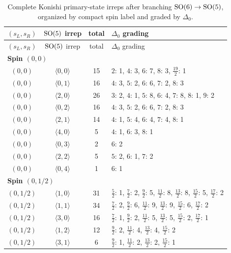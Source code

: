 \begin{longtable}{c c c p{8.8cm}}
\caption{Complete Konishi primary-state irreps after branching $\mathrm{SO}(6)\to \mathrm{SO}(5)$, organized by compact spin label and graded by $\Delta_0$.}\label{tab:konishi-full}\\
\toprule
$(s_L,s_R)$ & $\mathrm{SO}(5)$ irrep & total & $\Delta_0$ grading \\
\midrule
\endfirsthead
\toprule
$(s_L,s_R)$ & $\mathrm{SO}(5)$ irrep & total & $\Delta_0$ grading \\
\midrule
\endhead
\multicolumn{4}{l}{\textbf{Spin $(0,0)$}}\\
$(0,0)$ & $\langle 0,0\rangle$ & 15 & $2$: 1, $4$: 3, $6$: 7, $8$: 3, $\frac{19}{2}$: 1 \\
$(0,0)$ & $\langle 0,1\rangle$ & 16 & $4$: 3, $5$: 2, $6$: 6, $7$: 2, $8$: 3 \\
$(0,0)$ & $\langle 2,0\rangle$ & 26 & $3$: 2, $4$: 1, $5$: 8, $6$: 4, $7$: 8, $8$: 1, $9$: 2 \\
$(0,0)$ & $\langle 0,2\rangle$ & 16 & $4$: 3, $5$: 2, $6$: 6, $7$: 2, $8$: 3 \\
$(0,0)$ & $\langle 2,1\rangle$ & 14 & $4$: 1, $5$: 4, $6$: 4, $7$: 4, $8$: 1 \\
$(0,0)$ & $\langle 4,0\rangle$ & 5 & $4$: 1, $6$: 3, $8$: 1 \\
$(0,0)$ & $\langle 0,3\rangle$ & 2 & $6$: 2 \\
$(0,0)$ & $\langle 2,2\rangle$ & 5 & $5$: 2, $6$: 1, $7$: 2 \\
$(0,0)$ & $\langle 0,4\rangle$ & 1 & $6$: 1 \\
\midrule
\multicolumn{4}{l}{\textbf{Spin $(0,1/2)$}}\\
$(0,1/2)$ & $\langle 1,0\rangle$ & 31 & $\frac{5}{2}$: 1, $\frac{7}{2}$: 2, $\frac{9}{2}$: 5, $\frac{11}{2}$: 8, $\frac{13}{2}$: 8, $\frac{15}{2}$: 5, $\frac{17}{2}$: 2 \\
$(0,1/2)$ & $\langle 1,1\rangle$ & 34 & $\frac{7}{2}$: 2, $\frac{9}{2}$: 6, $\frac{11}{2}$: 9, $\frac{13}{2}$: 9, $\frac{15}{2}$: 6, $\frac{17}{2}$: 2 \\
$(0,1/2)$ & $\langle 3,0\rangle$ & 16 & $\frac{7}{2}$: 1, $\frac{9}{2}$: 2, $\frac{11}{2}$: 5, $\frac{13}{2}$: 5, $\frac{15}{2}$: 2, $\frac{17}{2}$: 1 \\
$(0,1/2)$ & $\langle 1,2\rangle$ & 12 & $\frac{9}{2}$: 2, $\frac{11}{2}$: 4, $\frac{13}{2}$: 4, $\frac{15}{2}$: 2 \\
$(0,1/2)$ & $\langle 3,1\rangle$ & 6 & $\frac{9}{2}$: 1, $\frac{11}{2}$: 2, $\frac{13}{2}$: 2, $\frac{15}{2}$: 1 \\

\end{longtable}
